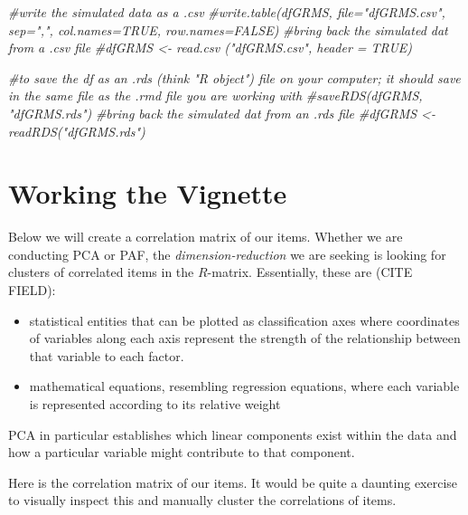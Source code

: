 \documentclass[
  english,
]{book}
\newenvironment{Shaded}{\begin{snugshade}}{\end{snugshade}}
\newcommand{\CommentTok}[1]{\textcolor[rgb]{0.56,0.35,0.01}{\textit{#1}}}
\providecommand{\tightlist}{%
  \setlength{\itemsep}{0pt}\setlength{\parskip}{0pt}}
\begin{document}
\begin{Shaded}
\begin{Highlighting}[]
\CommentTok{#write the simulated data  as a .csv}
\CommentTok{#write.table(dfGRMS, file="dfGRMS.csv", sep=",", col.names=TRUE, row.names=FALSE)}
\CommentTok{#bring back the simulated dat from a .csv file}
\CommentTok{#dfGRMS <- read.csv ("dfGRMS.csv", header = TRUE)}
\end{Highlighting}
\end{Shaded}

\begin{Shaded}
\begin{Highlighting}[]
\CommentTok{#to save the df as an .rds (think "R object") file on your computer; it should save in the same file as the .rmd file you are working with}
\CommentTok{#saveRDS(dfGRMS, "dfGRMS.rds")}
\CommentTok{#bring back the simulated dat from an .rds file}
\CommentTok{#dfGRMS <- readRDS("dfGRMS.rds")}
\end{Highlighting}
\end{Shaded}

\hypertarget{working-the-vignette}{%
\section{Working the Vignette}\label{working-the-vignette}}

Below we will create a correlation matrix of our items. Whether we are conducting PCA or PAF, the \emph{dimension-reduction} we are seeking is looking for clusters of correlated items in the \(R\)-matrix. Essentially, these are (CITE FIELD):

\begin{itemize}
\tightlist
\item
  statistical entities that can be plotted as classification axes where coordinates of variables along each axis represent the strength of the relationship between that variable to each factor.
\item
  mathematical equations, resembling regression equations, where each variable is represented according to its relative weight
\end{itemize}

PCA in particular establishes which linear components exist within the data and how a particular variable might contribute to that component.

Here is the correlation matrix of our items. It would be quite a daunting exercise to visually inspect this and manually cluster the correlations of items.
\end{document}
